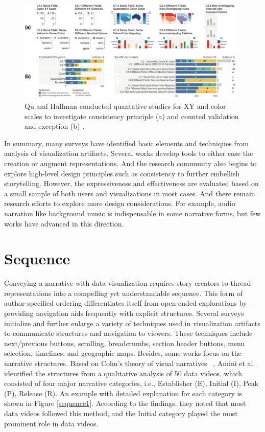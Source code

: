 \begin{figure}[htb]
	\centering 
	\includegraphics[width=0.98\textwidth]{figure/consistent1.png} 
	\caption{Qu and Hullman conducted quantative studies for XY and color scales to investigate consistency principle (a) and counted validation and exception (b) \cite{Qu2018}. } 
	\label{Consistent} 
\end{figure}


In summary, many surveys have identified basic elements and techniques from analysis of visualization artifacts. Several works develop tools to either ease the creation or augment representations. And the research community also begins to explore high-level design principles such as consistency to further embellish storytelling. However, the expressiveness and effectiveness are evaluated based on a small sample of both users and visualizations in most cases. And there remain research efforts to explore more design considerations. For example, audio narration like background music is indispensable in some narrative forms, but few works have advanced in this direction.

\section{Sequence}

Conveying a narrative with data visualization requires story creators to thread representations into a compelling yet understandable sequence. This form of author-specified ordering differentiates itself from open-ended explorations by providing navigation aids frequently with explicit structures. Several surveys ~\cite{Stolper2016, Segel2010} initialize and further enlarge a variety of techniques used in visualization artifacts to communicate structures and navigation to viewers. These techniques include next/previous buttons, scrolling, breadcrumbs, section header buttons, menu selection, timelines, and geographic maps. Besides, some works focus on the narrative structures. Based on Cohn's theory of visual narratives ~\cite{Cohn2013}, Amini et al. ~\cite{Amini2015} identified the structures from a qualitative analysis of 50 data videos, which consisted of four major narrative categories, i.e., Establisher (E), Initial (I), Peak (P), Release (R). An example with detailed explanation for each category is shown in Figure \ref{sequence1}. According to the findings, they noted that most data videos followed this method, and the Initial category played the most prominent role in data videos. 

